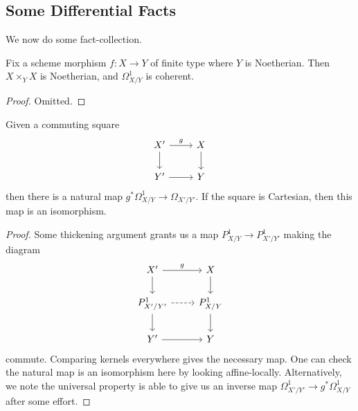 \documentclass[../notes.tex]{subfiles}
\begin{document}
\subsection{Some Differential Facts}
We now do some fact-collection.
\begin{lemma}
	Fix a scheme morphism $f\colon X\to Y$ of finite type where $Y$ is Noetherian. Then $X\times_YX$ is Noetherian, and $\Omega^1_{X/Y}$ is coherent.
\end{lemma}
\begin{proof}
	Omitted.
\end{proof}
\begin{lemma}
	Given a commuting square
	\[\begin{tikzcd}
		{X'} & X \\
		{Y'} & Y
		\arrow["g", from=1-1, to=1-2]
		\arrow[from=1-1, to=2-1]
		\arrow[from=2-1, to=2-2]
		\arrow[from=1-2, to=2-2]
	\end{tikzcd}\]
	then there is a natural map $g^*\Omega^1_{X/Y}\to\Omega_{X'/Y'}$. If the square is Cartesian, then this map is an isomorphism.
\end{lemma}
\begin{proof}
	Some thickening argument grants us a map $P^1_{X/Y}\to P^1_{X'/Y'}$ making the diagram
	\[\begin{tikzcd}
		{X'} & X \\
		{P^1_{X'/Y'}} & {P^1_{X/Y}} \\
		{Y'} & Y
		\arrow["g", from=1-1, to=1-2]
		\arrow[from=1-1, to=2-1]
		\arrow[from=2-1, to=3-1]
		\arrow[from=3-1, to=3-2]
		\arrow[from=1-2, to=2-2]
		\arrow[from=2-2, to=3-2]
		\arrow[dashed, from=2-1, to=2-2]
	\end{tikzcd}\]
	commute. Comparing kernels everywhere gives the necessary map. One can check the natural map is an isomorphism here by looking affine-locally. Alternatively, we note the universal property is able to give us an inverse map $\Omega^1_{X'/Y'}\to g^*\Omega^1_{X/Y}$ after some effort.
\end{proof}
\end{document}
